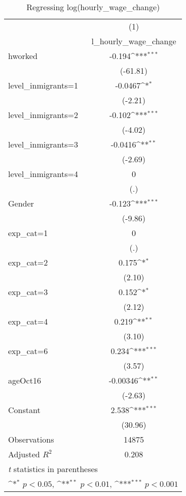 \begin{table}[htbp]\centering
\def\sym#1{\ifmmode^{#1}\else\(^{#1}\)\fi}
\caption{Regressing log(hourly\_wage\_change)}
\begin{tabular}{l*{1}{c}}
\hline\hline
                    &\multicolumn{1}{c}{(1)}\\
                    &\multicolumn{1}{c}{l\_hourly\_wage\_change}\\
\hline
hworked             &      -0.194\sym{***}\\
                    &    (-61.81)         \\
[1em]
level\_inmigrants=1  &     -0.0467\sym{*}  \\
                    &     (-2.21)         \\
[1em]
level\_inmigrants=2  &      -0.102\sym{***}\\
                    &     (-4.02)         \\
[1em]
level\_inmigrants=3  &     -0.0416\sym{**} \\
                    &     (-2.69)         \\
[1em]
level\_inmigrants=4  &           0         \\
                    &         (.)         \\
[1em]
Gender              &      -0.123\sym{***}\\
                    &     (-9.86)         \\
[1em]
exp\_cat=1           &           0         \\
                    &         (.)         \\
[1em]
exp\_cat=2           &       0.175\sym{*}  \\
                    &      (2.10)         \\
[1em]
exp\_cat=3           &       0.152\sym{*}  \\
                    &      (2.12)         \\
[1em]
exp\_cat=4           &       0.219\sym{**} \\
                    &      (3.10)         \\
[1em]
exp\_cat=6           &       0.234\sym{***}\\
                    &      (3.57)         \\
[1em]
ageOct16            &    -0.00346\sym{**} \\
                    &     (-2.63)         \\
[1em]
Constant            &       2.538\sym{***}\\
                    &     (30.96)         \\
\hline
Observations        &       14875         \\
Adjusted \(R^{2}\)  &       0.208         \\
\hline\hline
\multicolumn{2}{l}{\footnotesize \textit{t} statistics in parentheses}\\
\multicolumn{2}{l}{\footnotesize \sym{*} \(p<0.05\), \sym{**} \(p<0.01\), \sym{***} \(p<0.001\)}\\
\end{tabular}
\end{table}
